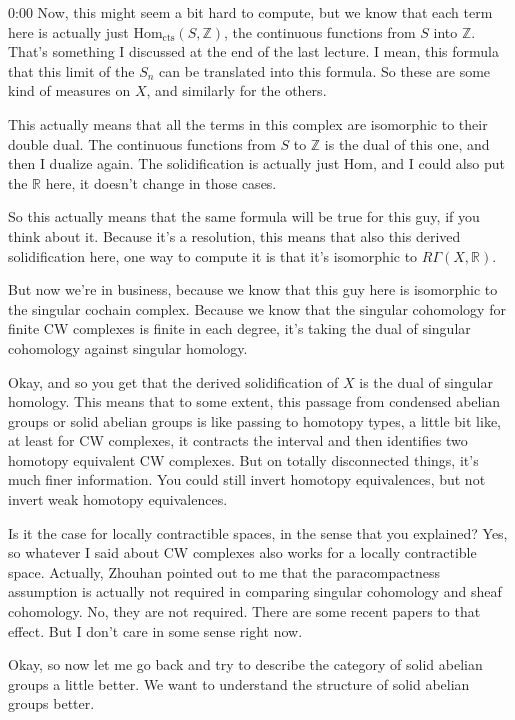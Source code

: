 \begin{unfinished}{0:00}
Now, this might seem a bit hard to compute, but we know that each term here is actually just $\mathrm{Hom}_{\mathrm{cts}}(S, \mathbb{Z})$, the continuous functions from $S$ into $\mathbb{Z}$. That's something I discussed at the end of the last lecture. I mean, this formula that this limit of the $S_n$ can be translated into this formula. So these are some kind of measures on $X$, and similarly for the others.

This actually means that all the terms in this complex are isomorphic to their double dual. The continuous functions from $S$ to $\mathbb{Z}$ is the dual of this one, and then I dualize again. The solidification is actually just $\mathrm{Hom}$, and I could also put the $\mathbb{R}$ here, it doesn't change in those cases.

So this actually means that the same formula will be true for this guy, if you think about it. Because it's a resolution, this means that also this derived solidification here, one way to compute it is that it's isomorphic to $R\Gamma(X, \mathbb{R})$.

But now we're in business, because we know that this guy here is isomorphic to the singular cochain complex. Because we know that the singular cohomology for finite CW complexes is finite in each degree, it's taking the dual of singular cohomology against singular homology.

Okay, and so you get that the derived solidification of $X$ is the dual of singular homology. This means that to some extent, this passage from condensed abelian groups or solid abelian groups is like passing to homotopy types, a little bit like, at least for CW complexes, it contracts the interval and then identifies two homotopy equivalent CW complexes. But on totally disconnected things, it's much finer information. You could still invert homotopy equivalences, but not invert weak homotopy equivalences.

Is it the case for locally contractible spaces, in the sense that you explained? Yes, so whatever I said about CW complexes also works for a locally contractible space. Actually, Zhouhan pointed out to me that the paracompactness assumption is actually not required in comparing singular cohomology and sheaf cohomology. No, they are not required. There are some recent papers to that effect. But I don't care in some sense right now.

Okay, so now let me go back and try to describe the category of solid abelian groups a little better. We want to understand the structure of solid abelian groups better.


\end{unfinished}
